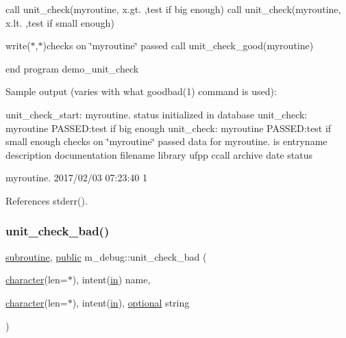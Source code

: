 call unit\+\_\+check(\textquotesingle{}myroutine\textquotesingle{}, x.\+gt. ,\textquotesingle{}test if big enough\textquotesingle{}) call unit\+\_\+check(\textquotesingle{}myroutine\textquotesingle{}, x.\+lt. ,\textquotesingle{}test if small enough\textquotesingle{})

write($\ast$,$\ast$)\textquotesingle{}checks on \char`\"{}myroutine\char`\"{} passed\textquotesingle{} call unit\+\_\+check\+\_\+good(\textquotesingle{}myroutine\textquotesingle{})

end program demo\+\_\+unit\+\_\+check

Sample output (varies with what goodbad(1) command is used)\+:

unit\+\_\+check\+\_\+start\+: myroutine. status initialized in database unit\+\_\+check\+: myroutine P\+A\+S\+S\+ED\+:test if big enough unit\+\_\+check\+: myroutine P\+A\+S\+S\+ED\+:test if small enough checks on \char`\"{}myroutine\char`\"{} passed data for myroutine. is entryname description documentation filename library ufpp ccall archive date status 

 myroutine. 2017/02/03 07\+:23\+:40 1 

References stderr().

\mbox{\label{namespacem__debug_a668813eec59e4c16d3bbc2d317e8cdee}} 
\subsubsection{\texorpdfstring{unit\+\_\+check\+\_\+bad()}{unit\_check\_bad()}}
{\footnotesize\ttfamily \hyperlink{M__stopwatch_83_8txt_acfbcff50169d691ff02d4a123ed70482}{subroutine}, \hyperlink{M__stopwatch_83_8txt_a2f74811300c361e53b430611a7d1769f}{public} m\+\_\+debug\+::unit\+\_\+check\+\_\+bad (\begin{DoxyParamCaption}\item[{\hyperlink{option__stopwatch_83_8txt_abd4b21fbbd175834027b5224bfe97e66}{character}(len=$\ast$), intent(\hyperlink{M__journal_83_8txt_afce72651d1eed785a2132bee863b2f38}{in})}]{name,  }\item[{\hyperlink{option__stopwatch_83_8txt_abd4b21fbbd175834027b5224bfe97e66}{character}(len=$\ast$), intent(\hyperlink{M__journal_83_8txt_afce72651d1eed785a2132bee863b2f38}{in}), \hyperlink{option__stopwatch_83_8txt_aa4ece75e7acf58a4843f70fe18c3ade5}{optional}}]{string }\end{DoxyParamCaption})}



